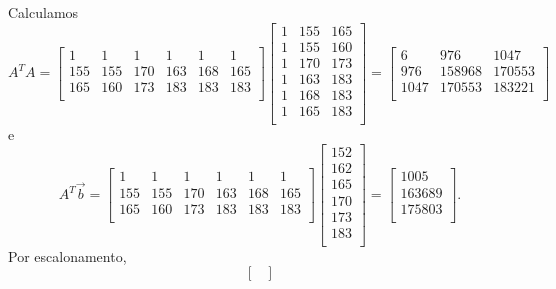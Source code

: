 \begin{ex}
\begin{equation}
  \end{equation} Calculamos
  \begin{equation}
  A^TA =
  \begin{bmatrix}
    1 & 1 & 1 & 1 & 1 & 1 \\
    155 & 155 & 170 & 163 & 168 & 165 \\
    165 & 160 & 173 & 183 & 183 & 183 \\
  \end{bmatrix}
  \begin{bmatrix}
    1 & 155 & 165 \\
    1 & 155 & 160 \\
    1 & 170 & 173 \\
    1 & 163 & 183 \\
    1 & 168 & 183 \\
    1 & 165 & 183 \\
  \end{bmatrix} =
  \begin{bmatrix}
    6 & 976 & 1047 \\
    976 & 158968 & 170553 \\
    1047 & 170553 & 183221 \\
  \end{bmatrix}
  \end{equation} e
  \begin{equation}
  A^T \vec{b} =
  \begin{bmatrix}
    1 & 1 & 1 & 1 & 1 & 1 \\
    155 & 155 & 170 & 163 & 168 & 165 \\
    165 & 160 & 173 & 183 & 183 & 183 \\
  \end{bmatrix}
  \begin{bmatrix}
    152  \\
    162  \\
    165  \\
    170  \\
    173  \\
    183  \\
  \end{bmatrix} =
  \begin{bmatrix}
    1005  \\
    163689  \\
    175803 \\
  \end{bmatrix}.
  \end{equation} Por escalonamento,
  \begin{equation}
  \begin{bmatrix}

\end{bmatrix}
\end{equation}
\end{ex}
